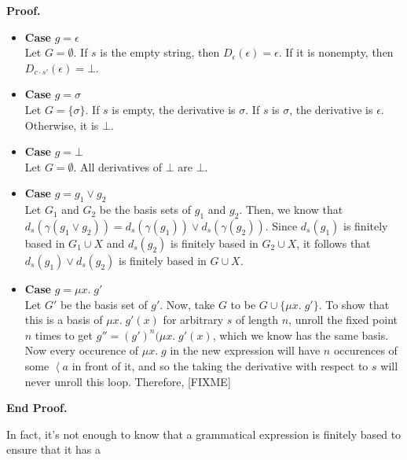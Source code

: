 \documentclass{article}
\newcommand{\fix}[2]{\mu {#1}.\;{#2}}
\newcommand{\lft}[1]{\left<{#1}\right.}
\newcommand{\setof}[1]{\{{#1}\}}
\newcommand{\deriv}[2]{d_{#1}({#2})}
\newenvironment{proof}{\noindent\textbf{Proof.}}
{\noindent\textbf{End Proof.}}
\newenvironment{caseblock}{\begin{itemize}}{\end{itemize}}
\newenvironment{case}[1]{\item \textbf{Case} {#1}\\}{}
\begin{document}
\begin{proof}
\begin{caseblock}
  \begin{case}{$g = \epsilon$}
    Let $G = \emptyset$. If $s$ is the empty string, 
    then $D_\epsilon(\epsilon) = \epsilon$. If it is nonempty, then $D_{c\cdot s'}(\epsilon) = \bot$. 
  \end{case}

  \begin{case}{$g = \sigma$}
    Let $G = \setof{\sigma}$. If $s$ is empty, the derivative is $\sigma$. 
    If $s$ is $\sigma$, the derivative is $\epsilon$. Otherwise, it is $\bot$. 
  \end{case}

  \begin{case}{$g = \bot$}
    Let $G = \emptyset$. All derivatives of $\bot$ are $\bot$. 
  \end{case}

  \begin{case}{$g = g_1 \vee g_2$}
    Let $G_1$ and $G_2$ be the basis sets of $g_1$ and $g_2$. Then, we know 
    that $\deriv{s}{\gamma(g_1 \vee g_2)} = \deriv{s}{\gamma(g_1)} \vee \deriv{s}{\gamma(g_2)}$. Since
    $\deriv{s}{g_1}$ is finitely based in $G_1 \cup X$ and $\deriv{s}{g_2}$ is finitely based in $G_2 \cup X$, 
    it follows that $\deriv{s}{g_1} \vee \deriv{s}{g_2}$ is finitely based in $G \cup X$. 
  \end{case}

  \begin{case}{$g = \fix{x}{g'}$}
    Let $G'$ be the basis set of $g'$. Now, take $G$ to be $G \cup \setof{\fix{x}{g'}}$. 
    To show that this is a basis of $\fix{x}{g'(x)}$ for arbitrary $s$ of length $n$, unroll
    the fixed point $n$ times to get $g'' = (g')^n(\fix{x}{g'(x)}$, which we know has the same basis. 
    Now every occurence of $\fix{x}{g}$ in the new expression will have $n$ occurences of some 
    $\lft{a}$ in front of it, and so the taking the derivative with respect to $s$ will never 
    unroll this loop. Therefore, [FIXME]
  \end{case}
\end{caseblock}
\end{proof}

In fact, it's not enough to know that a grammatical expression is
finitely based to ensure that it has a
\end{document}
